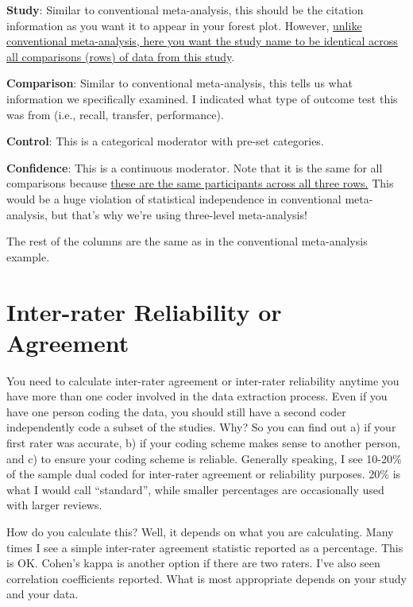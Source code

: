 \documentclass[
]{book}
\begin{document}
\textbf{Study}: Similar to conventional meta-analysis, this should be the citation information as you want it to appear in your forest plot. However, \ul{unlike conventional meta-analysis, here you want the study name to be identical across all comparisons (rows) of data from this study}.

\textbf{Comparison}: Similar to conventional meta-analysis, this tells us what information we specifically examined. I indicated what type of outcome test this was from (i.e., recall, transfer, performance).

\textbf{Control}: This is a categorical moderator with pre-set categories.

\textbf{Confidence}: This is a continuous moderator. Note that it is the same for all comparisons because \ul{these are the same participants across all three rows.} This would be a huge violation of statistical independence in conventional meta-analysis, but that's why we're using three-level meta-analysis!

The rest of the columns are the same as in the conventional meta-analysis example.

\hypertarget{inter-rater-reliability-or-agreement-1}{%
\section{Inter-rater Reliability or Agreement}\label{inter-rater-reliability-or-agreement-1}}

You need to calculate inter-rater agreement or inter-rater reliability anytime you have more than one coder involved in the data extraction process. Even if you have one person coding the data, you should still have a second coder independently code a subset of the studies. Why? So you can find out a) if your first rater was accurate, b) if your coding scheme makes sense to another person, and c) to ensure your coding scheme is reliable. Generally speaking, I see 10-20\% of the sample dual coded for inter-rater agreement or reliability purposes. 20\% is what I would call ``standard'', while smaller percentages are occasionally used with larger reviews.

How do you calculate this? Well, it depends on what you are calculating. Many times I see a simple inter-rater agreement statistic reported as a percentage. This is OK. Cohen's kappa is another option if there are two raters. I've also seen correlation coefficients reported. What is most appropriate depends on your study and your data.
\end{document}
